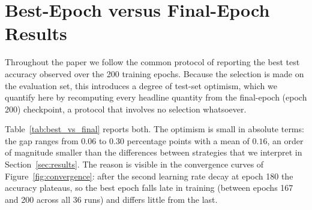 \documentclass[12pt,a4paper]{article}
\begin{document}
\begin{table}[H]
    \centering
    \caption{Per-seed head/medium accuracy (\%) for $\rho = 10$. Tail group is empty at this imbalance ratio.}
    \label{tab:per_seed_hmt_rho10}
\end{table}


\section{Best-Epoch versus Final-Epoch Results}
\label{app:best_vs_final}

Throughout the paper we follow the common protocol of reporting the best test accuracy observed over the 200 training epochs. Because the selection is made on the evaluation set, this introduces a degree of test-set optimism, which we quantify here by recomputing every headline quantity from the final-epoch (epoch 200) checkpoint, a protocol that involves no selection whatsoever.

Table~\ref{tab:best_vs_final} reports both. The optimism is small in absolute terms: the gap ranges from $0.06$ to $0.30$ percentage points with a mean of $0.16$, an order of magnitude smaller than the differences between strategies that we interpret in Section~\ref{sec:results}. The reason is visible in the convergence curves of Figure~\ref{fig:convergence}: after the second learning rate decay at epoch 180 the accuracy plateaus, so the best epoch falls late in training (between epochs 167 and 200 across all 36 runs) and differs little from the last.
\end{document}
